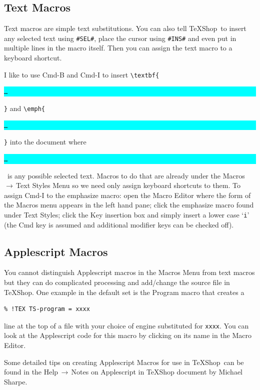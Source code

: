 \documentclass[letterpaper,11pt]{article}
\newcommand{\TS}{\textsf{\TeX Shop}}
\newcommand{\cmd}[1]{\textsf{#1}}
\newcommand{\mnu}[1]{\textsf{#1}}
\newcommand{\To}{\,\(\to\)\,}
\newcommand{\selection}{\colorbox{cyan}{\rule[-0.5ex]{0ex}{2.1ex}\texttt{…}}}
\begin{document}
\subsection{Text Macros}

Text macros are simple text substitutions. You can also tell \TS\ to insert any selected text using \verb|#SEL#|, place the cursor using \verb|#INS#| and even put in multiple lines in the macro itself. Then you can assign the text macro to a keyboard shortcut.

I like to use \cmd{Cmd-B} and \cmd{Cmd-I} to insert \verb|\textbf{|\selection\verb|}| and \verb|\emph{|\selection\verb|}| into the document where \selection\ is any possible selected text. Macros to do that are already under the \mnu{Macros}\To\mnu{Text Styles} Menu so we need only assign keyboard shortcuts to them. To assign \cmd{Cmd-I} to the \mnu{emphasize} macro: open the \mnu{Macro Editor} where the form of the \mnu{Macros} menu appears in the left hand pane; click the \mnu{emphasize} macro found under \mnu{Text Styles}; click the Key insertion box and simply insert a lower case `\texttt{i}' (the \cmd{Cmd} key is assumed and additional modifier keys can be checked off).

\subsection{Applescript Macros}

You cannot distinguish Applescript macros in the \mnu{Macros} Menu from text macros but they can do complicated processing and add/change the source file in \TS. One example in the default set is the \mnu{Program} macro that creates a
\begin{verbatim}
% !TEX TS-program = xxxx
\end{verbatim}
line at the top of a file with your choice of engine substituted for \texttt{xxxx}. You can look at the Applescript code for this macro by clicking on its name in the \mnu{Macro Editor}.

Some detailed tips on creating Applescript Macros for use in \TS\ can be found in the \mnu{Help}\To\mnu{Notes on Applescript in TeXShop} document by Michael Sharpe.

\end{document}

